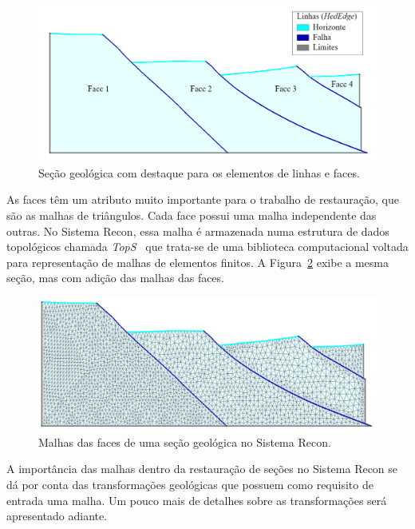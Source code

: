 \begin{figure} [h]
  \begin{center}
    \includegraphics[width=\textwidth]{images/fig-recon-2}
    \caption{Seção geológica com destaque para os elementos de linhas e faces.}\label{fig-recon-2}
  \end{center}
\end{figure}

As faces têm um atributo muito importante para o trabalho de restauração, que são as malhas de triângulos. Cada face possui uma malha independente das outras. No Sistema Recon, essa malha é armazenada numa estrutura de dados topológicos chamada \textit{TopS}~\cite{Tops} que trata-se de uma biblioteca computacional voltada para representação de malhas de elementos finitos. A Figura~\ref{fig-recon-3} exibe a mesma seção, mas com adição das malhas das faces.

\begin{figure} [H]
  \begin{center}
    \includegraphics[width=350pt]{images/fig-recon-3}
    \caption{Malhas das faces de uma seção geológica no Sistema Recon.}\label{fig-recon-3}
  \end{center}
\end{figure}

A importância das malhas dentro da restauração de seções no Sistema Recon se dá por conta das transformações geológicas que possuem como requisito de entrada uma malha. Um pouco mais de detalhes sobre as transformações será apresentado adiante.

